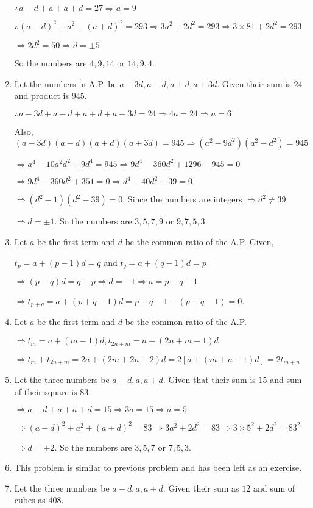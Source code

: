 \begin{enumerate}
  $\therefore a - d + a + a + d = 27 \Rightarrow a = 9$

  $\therefore (a - d)^2 + a^2 + (a + d)^2 = 293 \Rightarrow 3a^2 + 2d^2 = 293 \Rightarrow 3\times81 + 2d^2 = 293$

  $\Rightarrow 2d^2 = 50 \Rightarrow d = \pm5$

  So the numbers are $4, 9, 14$ or $14, 9, 4$.
\item Let the numbers in A.P. be $a - 3d, a - d, a + d, a + 3d$. Given their sum is $24$ and product is $945$.

  $\therefore a - 3d + a - d + a + d + a + 3d = 24 \Rightarrow 4a = 24 \Rightarrow a = 6$

  Also, $(a - 3d)(a - d)(a + d)(a + 3d) = 945 \Rightarrow (a^2 - 9d^2)(a^2 - d^2) = 945$

  $\Rightarrow a^4 - 10a^2d^2 + 9d^4 = 945 \Rightarrow 9d^4 - 360d^2 + 1296 - 945 = 0$

  $\Rightarrow 9d^4 - 360d^2 + 351 = 0 \Rightarrow d^4 - 40d^2 + 39 = 0$

  $\Rightarrow (d^2 - 1)(d^2 - 39) = 0$. Since the numbers are integers $\Rightarrow d^2 \neq 39$.

  $\Rightarrow d = \pm 1$. So the numbers are $3, 5, 7, 9$ or $9, 7, 5, 3$.
\item Let $a$ be the first term and $d$ be the common ratio of the A.P. Given,

  $t_p = a + (p - 1)d = q$ and $t_q = a + (q - 1)d = p$

  $\Rightarrow (p - q)d = q - p \Rightarrow d = -1 \Rightarrow a = p + q - 1$

  $\Rightarrow t_{p + q} = a + (p + q - 1)d = p + q - 1 - (p + q - 1) = 0$.
\item Let $a$ be the first term and $d$ be the common ratio of the A.P.

  $\Rightarrow t_m = a + (m - 1)d, t_{2n + m} = a + (2n + m - 1)d$

  $\Rightarrow t_m + t_{2n + m} = 2a + (2m + 2n - 2)d = 2[a + (m + n - 1)d] = 2t_{m + n}$
\item Let the three numbers be $a - d, a, a + d$. Given that their sum is $15$ and sum of their square is $83$.

  $\Rightarrow a - d + a + a + d = 15 \Rightarrow 3a = 15 \Rightarrow a = 5$

  $\Rightarrow (a - d)^2 + a^2 + (a + d)^2 = 83 \Rightarrow 3a^2 + 2d^2 = 83 \Rightarrow 3\times5^2 + 2d^2 = 83^2$

  $\Rightarrow d = \pm2$. So the numbers are $3, 5, 7$ or $7, 5, 3$.
\item This problem is similar to previous problem and has been left as an exercise.
\item Let the three numbers be $a - d, a, a + d$. Given their sum as $12$ and sum of cubes as $408$.


\end{enumerate}

